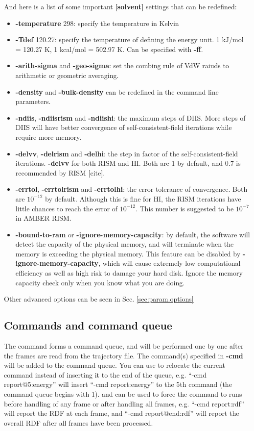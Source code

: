 \documentclass[aip,amsmath,amssymb,reprint,onecolumn]{revtex4-1}
\newcommand{\citemark}{\color{red}}
\begin{document}
And here is a list of some important {\bf [solvent]} settings that can be redefined:

\begin{itemize}
    \item {\bf -temperature} 298: specify the temperature in Kelvin
    \item {\bf -Tdef} 120.27: specify the temperature of defining the energy unit. 1 kJ/mol = 120.27 K, 1 kcal/mol = 502.97 K. Can be specified with {\bf -ff}.
    \item {\bf -arith-sigma} and {\bf -geo-sigma}: set the combing rule of VdW raiuds to arithmetic or geometric averaging.
    \item {\bf -density} and {\bf -bulk-density} can be redefined in the command line parameters.
    \item {\bf -ndiis}, {\bf -ndiisrism} and {\bf -ndiishi}: the maximum steps of DIIS. More steps of DIIS will have better convergence of self-consistent-field iterations while require more memory.
    \item {\bf -delvv}, {\bf -delrism} and {\bf -delhi}: the step in factor of the self-consistent-field iterations. {\bf -delvv} for both RISM and HI. Both are 1 by default, and 0.7 is recommended by RISM {\citemark [cite]}.
    \item {\bf -errtol}, {\bf -errtolrism} and {\bf -errtolhi}: the error tolerance of convergence. Both are $10^{-12}$ by default. Although this is fine for HI, the RISM iterations have little chances to reach the error of $10^{-12}$. This number is suggested to be $10^{-7}$ in AMBER RISM.
    \item {\bf -bound-to-ram} or {\bf -ignore-memory-capacity}: by default, the software will detect the capacity of the physical memory, and will terminate when the memory is exceeding the physical memory. This feature can be disabled by {\bf -ignore-memory-capacity}, which will cause extremely low computational efficiency as well as high risk to damage your hard disk. Ignore the memory capacity check only when you know what you are doing.
\end{itemize}

Other advanced options can be seen in Sec. \ref{sec:param.options}

\subsection{Commands and command queue}\label{sec:param.command}

The command forms a command queue, and will be performed one by one after the frames are read from the trajectory file. The command(s) specified in {\bf -cmd} will be added to the command queue. You can use \@ to relocate the current command instead of inserting it to the end of the queue, e.g. ``-cmd report@5:energy'' will insert ``-cmd report:energy'' to the 5th command (the command queue begins with 1). \@b and \@e can be used to force the command to runs before handling of any frame or after handling all frames, e.g. ``-cmd report:rdf'' will report the RDF at each frame, and ``-cmd report@end:rdf'' will report the overall RDF after all frames have been processed.
\end{document}
